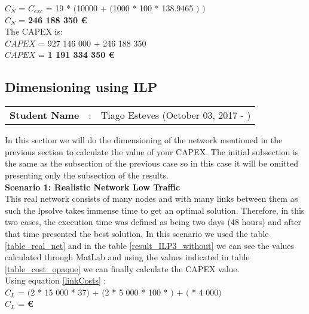 $C_N$ = $C_{exc}$ = 19 * $($10000 + $($1000 * 100 * 138.9465 $)$ $)$\\

$C_N$ = \textbf{246 188 350 \euro}\\

The CAPEX is:\\
$CAPEX$ = 927 146 000 + 246 188 350\\

$CAPEX$ = \textbf{1 191 334 350 \euro}\\


\subsection{Dimensioning using ILP}
\begin{tcolorbox}	
\begin{tabular}{p{2.75cm} p{0.2cm} p{10.5cm}} 	
\textbf{Student Name}  &:& Tiago Esteves    (October 03, 2017 - )\\
\end{tabular}
\end{tcolorbox}

In this section we will do the dimensioning of the network mentioned in the previous section to calculate the value of your CAPEX.
The initial subsection is the same as the subsection of the previous case so in this case it will be omitted presenting only the subsection of the results.\\

\textbf{Scenario 1: Realistic Network Low Traffic} \label{Scenario3_opaque} \\

This real network consists of many nodes and with many links between them as such the lpsolve takes immense time to get an optimal solution. Therefore, in this two cases, the execution time was defined as being two days (48 hours) and after that time presented the best solution. In this scenario we used the table \ref{table_real_net} and in the table \ref{result_ILP3_without} we can see the values calculated through MatLab and using the values indicated in table \ref{table_cost_opaque} we can finally calculate the CAPEX value.\\

Using equation \ref{linkCosts} : \\
$C_L$ = $($2 * 15 000 * 37$)$ + $($2 * 5 000 * 100 *  $)$ + $($ * 4 000$)$ \\
$C_L$ = \textbf{\euro} \\

